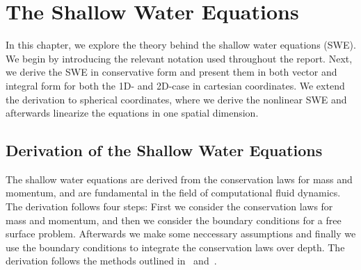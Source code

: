 \chapter{The Shallow Water Equations}\label{ch:theory}
In this chapter, we explore the theory behind the shallow water equations (SWE).
We begin by introducing the relevant notation used throughout the report.
Next, we derive the SWE in conservative form and present them in both vector and integral form for both the 1D- and 2D-case in cartesian coordinates.
We extend the derivation to spherical coordinates, where we derive the nonlinear SWE and afterwards linearize the equations in one spatial dimension.



\section{Derivation of the Shallow Water Equations}
The shallow water equations are derived from the conservation laws for mass and momentum, and are fundamental in the field of computational fluid dynamics.
The derivation follows four steps: First we consider the conservation laws for mass and momentum, and then we consider the boundary conditions for a free surface problem.
Afterwards we make some neccessary assumptions and finally we use the boundary conditions to integrate the conservation laws over depth.
The derivation follows the methods outlined in~\cite{Toro2001-Shock} and~\cite{Vreugdenhil1994}.


